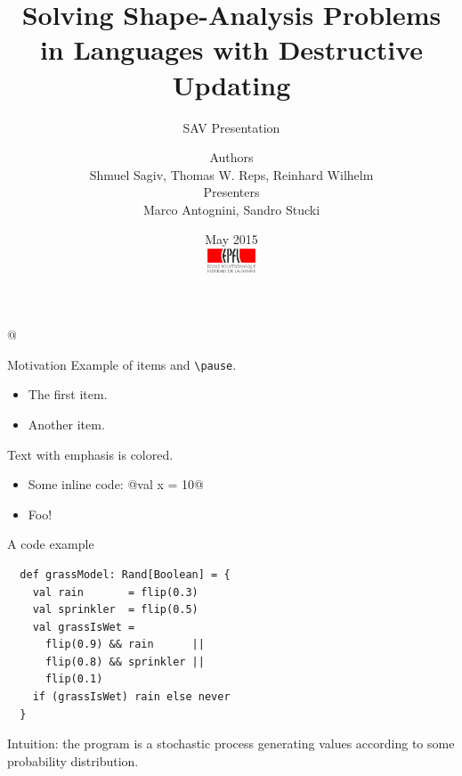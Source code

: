 \documentclass[xcolor={usenames,dvipsnames}]{beamer}
\title{Solving Shape-Analysis Problems in Languages with Destructive Updating}
\subtitle{SAV Presentation}
\author[Sagiv~et~al.]{%
  {\small Authors}\\ \vspace{1ex}
  Shmuel Sagiv, Thomas W. Reps, Reinhard Wilhelm \\
  \vspace{1em}
  {\small Presenters}\\ \vspace{1ex}
  Marco Antognini, Sandro Stucki
}
\date{%
  \vspace{-1em}
  \small May 2015\\[2em]
  \includegraphics[height=7mm]{img/epfl-logo}}
\renewcommand{\emph}[1]{\alert{#1}}
\begin{document}
\begin{frame}
  \titlepage
\end{frame}

\lstMakeShortInline[%
  style=scala-color,%
  flexiblecolumns=false,%
  mathescape=false,%
  basicstyle=\color{blue!30!darkgray}\tt]@




\begin{frame}[fragile]{Motivation}
  Example of items and \verb!\pause!.
  \begin{itemize}
  \item The first item.\pause
  \item Another item.
  \end{itemize}
  \vspace{1em}

  Text with emphasis is \emph{colored}.
  \begin{itemize}
  \item Some inline code: @val x = 10@
  \item Foo!
  \end{itemize}
\end{frame}

\begin{frame}[fragile]{A code example}
  \begin{lstlisting}
  def grassModel: Rand[Boolean] = {
    val rain       = flip(0.3)
    val sprinkler  = flip(0.5)
    val grassIsWet =
      flip(0.9) && rain      ||
      flip(0.8) && sprinkler ||
      flip(0.1)
    if (grassIsWet) rain else never
  }
  \end{lstlisting}
  \emph{Intuition:} the program is a \emph{stochastic process}
  generating values according to some \emph{probability distribution}.
\end{frame}
\end{document}
